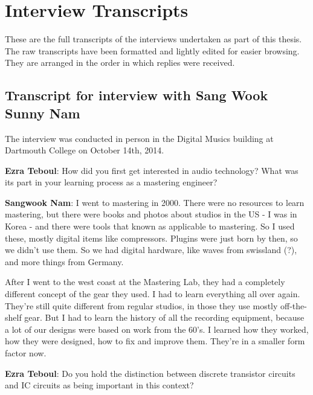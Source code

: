 
\chapter{Interview Transcripts}\label{app:inttrans} %


These are the full transcripts of the interviews undertaken as part of this thesis. The raw transcripts have been formatted and lightly edited for easier browsing. They are arranged in the order in which replies were received.  

\clearpage 
\section{Transcript for interview with Sang Wook Sunny Nam}

The interview was conducted in person in the Digital Musics building at Dartmouth College on October 14th, 2014. 

\textbf{Ezra Teboul}: How did you first get interested in audio technology? What was its part in your learning process as a mastering engineer?

\textbf{Sangwook Nam}: I went to mastering in 2000. There were no resources to learn mastering, but there were books and photos about studios in the US - I was in Korea - and there were tools that known as applicable to mastering. So I used these, mostly digital items like compressors. Plugins were just born by then, so we didn't use them. So we had digital hardware, like waves from swissland (?), and more things from Germany.

After I went to the west coast at the Mastering Lab, they had a completely different concept of the gear they used. I had to learn everything all over again. They're still quite different from regular studios, in those they use mostly off-the-shelf gear. But I had to learn the history of all the recording equipment, because a lot of our designs were based on work from the 60's. I learned how they worked, how they were designed, how to fix and improve them. They're in a smaller form factor now.

\textbf{Ezra Teboul}: Do you hold the distinction between discrete transistor circuits and IC circuits as being important in this context?

